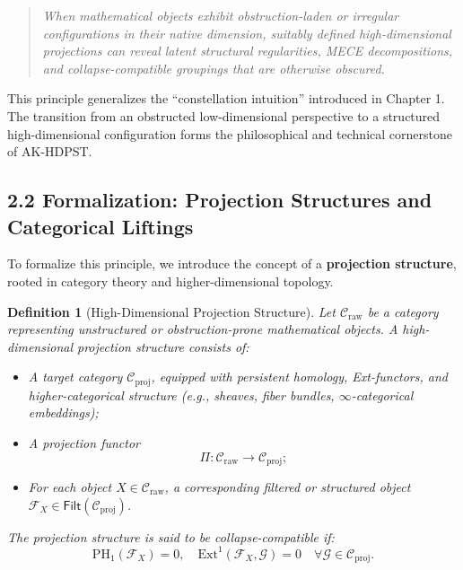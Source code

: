 \documentclass[11pt]{article}
\newtheorem{definition}[theorem]{Definition}
\begin{document}
\begin{quote}
\textit{
When mathematical objects exhibit obstruction-laden or irregular configurations in their native dimension,  
suitably defined high-dimensional projections can reveal latent structural regularities, MECE decompositions,  
and collapse-compatible groupings that are otherwise obscured.
}
\end{quote}

This principle generalizes the ``constellation intuition'' introduced in Chapter 1. The transition from an obstructed low-dimensional perspective to a structured high-dimensional configuration forms the philosophical and technical cornerstone of AK-HDPST.

\subsection*{2.2 Formalization: Projection Structures and Categorical Liftings}

To formalize this principle, we introduce the concept of a \textbf{projection structure}, rooted in category theory and higher-dimensional topology.

\begin{definition}[High-Dimensional Projection Structure]
Let \( \mathcal{C}_{\mathrm{raw}} \) be a category representing unstructured or obstruction-prone mathematical objects.  
A \emph{high-dimensional projection structure} consists of:

\begin{itemize}
    \item A target category \( \mathcal{C}_{\mathrm{proj}} \), equipped with persistent homology, Ext-functors, and higher-categorical structure (e.g., sheaves, fiber bundles, $\infty$-categorical embeddings);
    \item A projection functor
    \[
    \Pi : \mathcal{C}_{\mathrm{raw}} \longrightarrow \mathcal{C}_{\mathrm{proj}};
    \]
    \item For each object \( X \in \mathcal{C}_{\mathrm{raw}} \), a corresponding filtered or structured object \( \mathcal{F}_X \in \mathsf{Filt}(\mathcal{C}_{\mathrm{proj}}) \).
\end{itemize}

The projection structure is said to be \emph{collapse-compatible} if:
\[
\mathrm{PH}_1(\mathcal{F}_X) = 0, \quad \mathrm{Ext}^1(\mathcal{F}_X, \mathcal{G}) = 0 \quad \forall \mathcal{G} \in \mathcal{C}_{\mathrm{proj}}.
\]
\end{definition}
\end{document}
